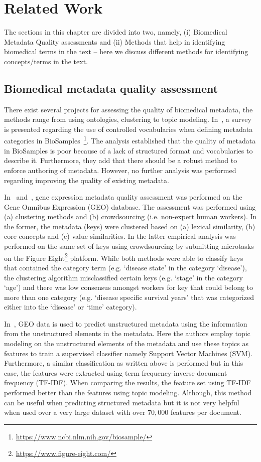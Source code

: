 \chapter{Related Work}\label{chap2}
The sections in this chapter are divided into two, namely, (i) Biomedical Metadata Quality assessments and (ii) Methods that help in identifying biomedical terms in the text -- here we discuss different methods for identifying concepts/terms in the text. 

\section{Biomedical metadata quality assessment}
There exist several projects for assessing the quality of biomedical metadata, the methods range from using ontologies, clustering to topic modeling. 
In~\cite{gonccalves2017metadata}, a survey is presented regarding the use of controlled vocabularies when defining metadata categories in BioSamples~\footnote{\url{https://www.ncbi.nlm.nih.gov/biosample/}}. The analysis established that the quality of metadata in BioSamples is poor because of a lack of structured format and vocabularies to describe it. Furthermore, they add that there should be a robust method to enforce authoring of metadata. However, no further analysis was performed regarding improving the quality of existing metadata. 

In~\cite{Hu2017} and~\cite{zaveri2017metacrowd}, gene expression metadata quality assessment was performed on the Gene Omnibus Expression (GEO) database. The assessment was performed using (a) clustering methods and (b) crowdsourcing (i.e. non-expert human workers). In the former, the metadata (keys) were clustered based on (a) lexical similarity, (b) core concepts and (c) value similarities. In the latter empirical analysis was performed on the same set of keys using crowdsourcing by submitting microtasks on the Figure Eight\footnote{\url{https://www.figure-eight.com/}} platform. While both methods were able to classify keys that contained the category term (e.g. `disease state' in the category `disease'), the clustering algorithm misclassified certain keys (e.g. `stage' in the category `age') and there was low consensus amongst workers for key that could belong to more than one category (e.g. `disease specific survival years' that was categorized either into the `disease' or `time' category).

In~\cite{posch2016predicting}, GEO data is used to predict unstructured metadata using the information from the unstructured elements in the metadata. Here the authors employ topic modeling on the unstructured elements of the metadata and use these topics as features to train a supervised classifier namely Support Vector Machines (SVM). Furthermore, a similar classification as written above is performed but in this case, the features were extracted using term frequency-inverse document frequency (TF-IDF). When comparing the results, the feature set using TF-IDF performed better than the features using topic modeling. Although, this method can be useful when predicting structured metadata but it is not very helpful when used over a very large dataset with over $70,000$ features per document.

